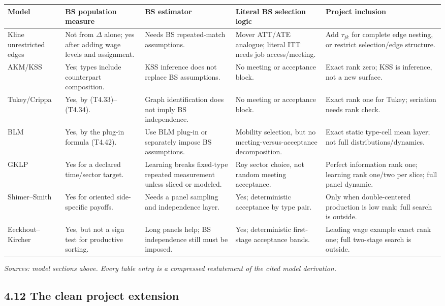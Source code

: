\documentclass[11pt]{article}
\begin{document}
\begin{longtable}{p{}p{}p{}p{}p{}}
\textbf{Model} & \textbf{BS population measure} &
\textbf{BS estimator} & \textbf{Literal BS selection logic} &
\textbf{Project inclusion} \\
\hline
Kline unrestricted edges &
Not from \(\Delta\) alone; yes after adding wage levels and assignment. &
Needs BS repeated-match assumptions. &
Mover ATT/ATE analogue; literal ITT needs job access/meeting. &
Add \(\tau_{jk}\) for complete edge nesting, or restrict selection/edge
structure. \\
AKM/KSS &
Yes; types include counterpart composition. &
KSS inference does not replace BS assumptions. &
No meeting or acceptance block. &
Exact rank zero; KSS is inference, not a new surface. \\
Tukey/Crippa &
Yes, by (T4.33)--(T4.34). &
Graph identification does not imply BS independence. &
No meeting or acceptance block. &
Exact rank one for Tukey; seriation needs rank check. \\
BLM &
Yes, by the plug-in formula (T4.42). &
Use BLM plug-in or separately impose BS assumptions. &
Mobility selection, but no meeting-versus-acceptance decomposition. &
Exact static type-cell mean layer; not full distributions/dynamics. \\
GKLP &
Yes for a declared time/sector target. &
Learning breaks fixed-type repeated measurement unless sliced or modeled. &
Roy sector choice, not random meeting acceptance. &
Perfect information rank one; learning rank one/two per slice; full panel
dynamic. \\
Shimer--Smith &
Yes for oriented side-specific payoffs. &
Needs a panel sampling and independence layer. &
Yes; deterministic acceptance by type pair. &
Only when double-centered production is low rank; full search is outside. \\
Eeckhout--Kircher &
Yes, but not a sign test for productive sorting. &
Long panels help; BS independence still must be imposed. &
Yes; deterministic first-stage acceptance bands. &
Leading wage example exact rank one; full two-stage search is outside. \\
\end{longtable}

\textit{Sources: model sections above.  Every table entry is a compressed
restatement of the cited model derivation.}

\subsection{4.12 The clean project extension}
\end{document}
